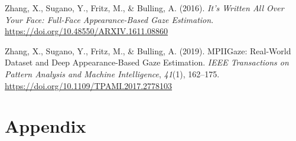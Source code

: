 \documentclass[
  man,floatsintext]{apa6}
\newlength{\cslhangindent}
\newenvironment{CSLReferences}[2] %
 {\begin{list}{}{%
  \setlength{\itemindent}{0pt}
  \setlength{\leftmargin}{0pt}
  \setlength{\parsep}{0pt}
  \ifodd #1
   \setlength{\leftmargin}{\cslhangindent}
   \setlength{\itemindent}{-1\cslhangindent}
  \fi
  \setlength{\itemsep}{#2\baselineskip}}}
 {\end{list}}
\begin{document}
\begin{CSLReferences}{1}{0}
Zhang, X., Sugano, Y., Fritz, M., \& Bulling, A. (2016). \emph{It's {Written All Over Your Face}: {Full-Face Appearance-Based Gaze Estimation}}. \url{https://doi.org/10.48550/ARXIV.1611.08860}

Zhang, X., Sugano, Y., Fritz, M., \& Bulling, A. (2019). {MPIIGaze}: {Real-World Dataset} and {Deep Appearance-Based Gaze Estimation}. \emph{IEEE Transactions on Pattern Analysis and Machine Intelligence}, \emph{41}(1), 162--175. \url{https://doi.org/10.1109/TPAMI.2017.2778103}

\end{CSLReferences}

\endgroup

\newpage

\section{Appendix}\label{appendix}
\end{document}
